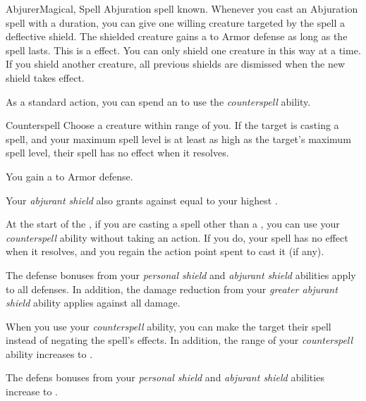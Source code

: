     \begin{feat}{Abjurer}{Magical, Spell}
        \featpre Abjuration spell known.
         Whenever you cast an Abjuration spell with a duration, you can give one willing creature targeted by the spell a deflective shield.
        The shielded creature gains a   to Armor defense as long as the spell lasts.
        This is a   effect.
        You can only shield one creature in this way at a time.
        If you shield another creature, all previous shields are dismissed when the new shield takes effect.

         As a standard action, you can spend an  to use the \textit{counterspell} ability.
        \begin{ability}{Counterspell}
            Choose a creature within \rngmed range of you.
            If the target is casting a spell, and your maximum spell level is at least as high as the target's maximum spell level, their spell has no effect when it resolves.
        \end{ability}

         You gain a   to Armor defense.

         Your \textit{abjurant shield} also grants  against  equal to your highest .

         At the start of the , if you are casting a spell other than a , you can use your \textit{counterspell} ability without taking an action.
        If you do, your spell has no effect when it resolves, and you regain the action point spent to cast it (if any).

         The defense bonuses from your \textit{personal shield} and \textit{abjurant shield} abilities apply to all defenses.
        In addition, the damage reduction from your \textit{greater abjurant shield} ability applies against all damage.

         When you use your \textit{counterspell} ability, you can make the target  their spell instead of negating the spell's effects.
        In addition, the range of your \textit{counterspell} ability increases to \rnglong.

         The defens bonuses from your \textit{personal shield} and \textit{abjurant shield} abilities increase to .
    \end{feat}

